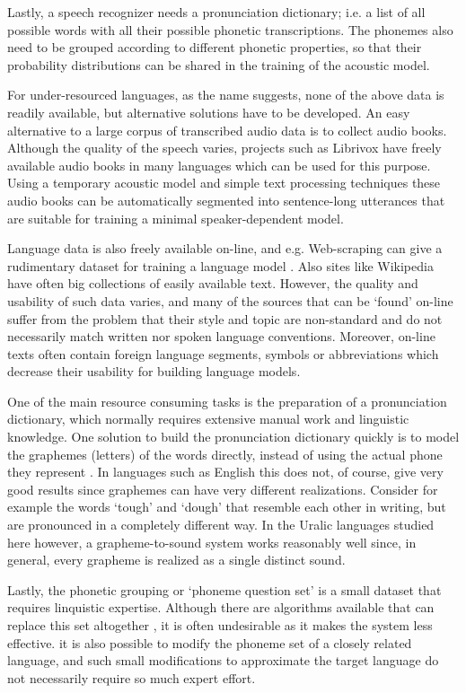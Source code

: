 \documentclass[b5paper]{article}
\begin{document}
Lastly, a speech recognizer needs a pronunciation dictionary; i.e. a list of all possible words with all their possible phonetic transcriptions. The phonemes also need to be grouped according to different phonetic properties, so that their probability distributions can be shared in the training of the acoustic model.

For under-resourced languages, as the name suggests, none of the above data is readily available, but alternative solutions have to be developed. An easy alternative to a large corpus of transcribed audio data is to collect audio books. Although the quality of the speech varies, projects such as Librivox have freely available audio books in many languages which can be used for this purpose. Using a temporary acoustic model and simple text processing techniques these audio books can be automatically segmented into sentence-long utterances that are suitable for training a minimal speaker-dependent model.

Language data is also freely available on-line, and e.g. Web-scraping can give a rudimentary dataset for training a language model \cite{scannell2007crubadan}.  Also sites like Wikipedia have often big collections of easily available text. However, the quality and usability of such data varies, and many of the sources that can be `found' on-line suffer from the problem that their style and topic are non-standard and do not necessarily match written nor spoken language conventions. Moreover, on-line texts often contain foreign language segments, symbols or abbreviations which decrease their usability for building language models.

One of the main resource consuming tasks is the preparation of a pronunciation dictionary, which normally requires extensive manual work and linguistic knowledge. One solution to build the pronunciation dictionary quickly is to model the graphemes (letters) of the words directly, instead of using the actual phone they represent \cite{kanthak2003multilingual}. In languages such as English this does not, of course, give very good results since graphemes can have very different realizations. Consider for example the words `tough' and `dough' that resemble each other in writing, but are pronounced in a completely different way. In the Uralic languages studied here however, a grapheme-to-sound system works reasonably well since, in general, every grapheme is realized as a single distinct sound.

Lastly, the phonetic grouping or `phoneme question set' is a small dataset that requires linquistic expertise. Although there are algorithms available that can replace this set altogether \cite{darjaa2011effective}, it is often undesirable as it makes the system less effective. it is also possible to modify the phoneme set of a closely related language, and such small modifications to approximate the target language do not necessarily require so much expert effort.
\end{document}

